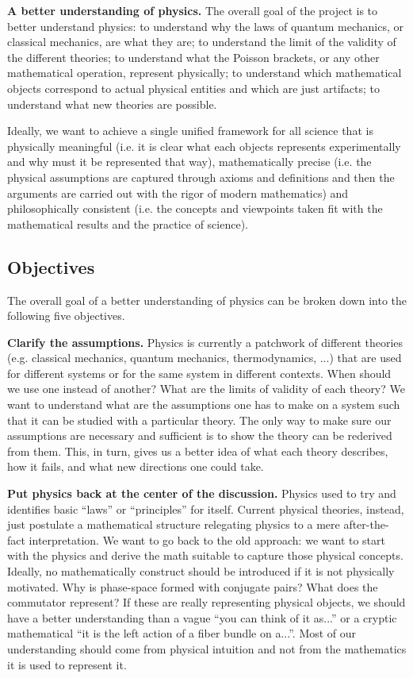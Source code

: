 \documentclass[twocolumn]{article}
\begin{document}
\textbf{A better understanding of physics.} The overall goal of the project is to better understand physics: to understand why the laws of quantum mechanics, or classical mechanics, are what they are; to understand the limit of the validity of the different theories; to understand what the Poisson brackets, or any other mathematical operation, represent physically; to understand which mathematical objects correspond to actual physical entities and which are just artifacts; to understand what new theories are possible.

Ideally, we want to achieve a single unified framework for all science that is physically meaningful (i.e. it is clear what each objects represents experimentally and why must it be represented that way), mathematically precise (i.e. the physical assumptions are captured through axioms and definitions and then the arguments are carried out with the rigor of modern mathematics) and philosophically consistent (i.e. the concepts and viewpoints taken fit with the mathematical results and the practice of science).

\subsection{Objectives}

The overall goal of a better understanding of physics can be broken down into the following five objectives.

\textbf{Clarify the assumptions.} Physics is currently a patchwork of different theories (e.g. classical mechanics, quantum mechanics, thermodynamics, ...) that are used for different systems or for the same system in different contexts. When should we use one instead of another? What are the limits of validity of each theory? We want to understand what are the assumptions one has to make on a system such that it can be studied with a particular theory. The only way to make sure our assumptions are necessary and sufficient is to show the theory can be rederived from them. This, in turn, gives us a better idea of what each theory describes, how it fails, and what new directions one could take.

\textbf{Put physics back at the center of the discussion.} Physics used to try and identifies basic ``laws'' or ``principles'' for itself. Current physical theories, instead, just postulate a mathematical structure relegating physics to a mere after-the-fact interpretation. We want to go back to the old approach: we want to start with the physics and derive the math suitable to capture those physical concepts. Ideally, no mathematically construct should be introduced if it is not physically motivated. Why is phase-space formed with conjugate pairs? What does the commutator represent? If these are really representing physical objects, we should have a better understanding than a vague ``you can think of it as...'' or a cryptic mathematical ``it is the left action of a fiber bundle on a...''. Most of our understanding should come from physical intuition and not from the mathematics it is used to represent it.
\end{document}
